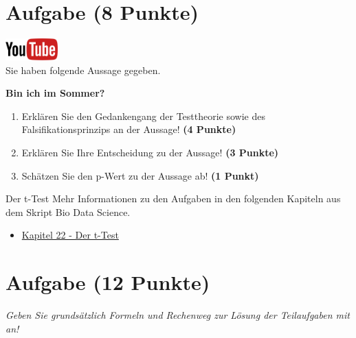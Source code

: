 \documentclass[a4paper, 10pt]{scrartcl}\usepackage[]{graphicx}\usepackage[]{xcolor}
\begin{document}
\clearpage

\section{Aufgabe \hfill (8 Punkte)}

\hfill\href{https://youtu.be/gQwvMuZ-Sjs}{\includegraphics[width =
  2cm]{img/youtube}}\\[1Ex]



Sie haben folgende Aussage gegeben.

\begin{center}
  \Large\textbf{Bin ich im Sommer?}
\end{center}

\begin{enumerate}
\item Erkl{\"a}ren Sie den Gedankengang der Testtheorie sowie des Falsifikationsprinzips an der Aussage! \textbf{(4 Punkte)}
\item Erkl{\"a}ren Sie Ihre Entscheidung zu der Aussage! \textbf{(3 Punkte)}
\item Sch{\"a}tzen Sie den p-Wert zu der Aussage ab! \textbf{(1 Punkt)}
\end{enumerate}

 
\clearpage
\begin{graybox}{Der t-Test}
Mehr Informationen zu den Aufgaben in den folgenden Kapiteln aus dem Skript Bio Data Science.
  \begin{itemize}
  \item \href{https://jkruppa.github.io/stat-tests-ttest.html}{Kapitel 22 - Der t-Test}
  \end{itemize}
\end{graybox}
\clearpage

\section{Aufgabe \hfill (12 Punkte)}

\textit{Geben Sie grunds{\"a}tzlich Formeln und Rechenweg zur L{\"o}sung der
  Teilaufgaben mit an!} \\[1Ex]
\end{document}
